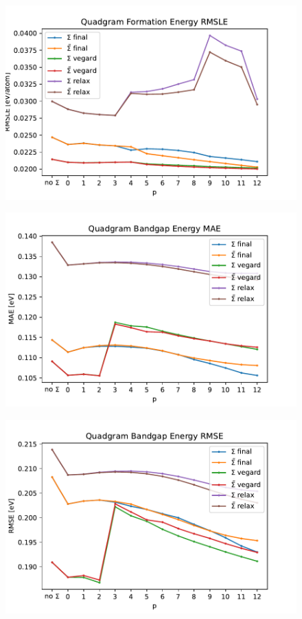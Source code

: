 \documentclass[11pt,oneside,czech,american]{book} %
\theoremstyle{definition} %
\theoremstyle{definition}
\begin{document}
\begin{figure}[H]
	\centering
	\includegraphics[scale=0.6]{quadgram_RMSLE_form.pdf}
	\caption{}
	\label{}
\end{figure}
\begin{figure}[H]
	\centering
	\includegraphics[scale=0.6]{quadgram_MAE_gap.pdf}
	\caption{}
	\label{}
\end{figure}
\begin{figure}[H]
	\centering
	\includegraphics[scale=0.6]{quadgram_RMSE_gap.pdf}
	\caption{}
	\label{}
\end{figure}
\end{document}
